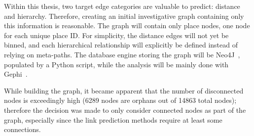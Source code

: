 Within this thesis, two target edge categories are valuable to predict: distance and hierarchy.
Therefore, creating an initial investigative graph containing only this information is reasonable.
The graph will contain only place nodes, one node for each unique place ID. For simplicity, the distance edges
will not yet be binned, and each hierarchical relationship will explicitly be defined instead of relying on meta-paths.
The database engine storing the graph will be Neo4J~\cite{Neo4j}, populated by a Python script, while the analysis will be mainly done
with Gephi~\cite{Gephi}.

While building the graph, it became apparent that the number of disconnected nodes is exceedingly high (6289 nodes are orphans out of 14863 total nodes); therefore
the decision was made to only consider connected nodes as part of the graph, especially since the link prediction methods
require at least some connections.